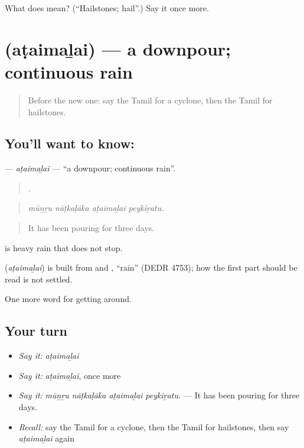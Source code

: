 \begin{tcolorbox}[breakable,colback=teal!4,colframe=teal!35!black,title={Before you move on}]
What does  mean? (\textquotedblleft{}Hailstones; hail\textquotedblright{}.) Say it once more.
\end{tcolorbox}
\section[\texorpdfstring{\ta{அடைமழை} (aṭaimaḻai)}{அடைமழை (aṭaimaḻai)}]{ (aṭaimaḻai) — a downpour; continuous rain}

\label{lesson:TA-C429-ataimalai}



\begin{quote}
Before the new one: say the Tamil for a cyclone, then the Tamil for hailstones.
\end{quote}

\subsection*{You'll want to know: }
\textbf{} — \emph{aṭaimaḻai} — \textquotedblleft{}a downpour; continuous rain\textquotedblright{}.

\begin{quote}
   .
\end{quote}

\begin{quote}
\emph{mūṉṟu nāṭkaḷāka aṭaimaḻai peykiṟatu.}
\end{quote}

\begin{quote}
It has been pouring for three days.
\end{quote}

 is heavy rain that does not stop.

\begin{cousinweb}
\textbf{} (\emph{aṭaimaḻai}) is built from  and , \textquotedblleft{}rain\textquotedblright{} (DEDR 4753); how the first part should be read is not settled.
\end{cousinweb}

\begin{grammarlens}[title={What you've built}]
One more word for getting around.
\end{grammarlens}

\subsection*{Your turn}
\begin{itemize}
\raggedright
  \item \emph{Say it:} \emph{aṭaimaḻai}
  \item \emph{Say it:} \emph{aṭaimaḻai}, once more
  \item \emph{Say it:} \emph{mūṉṟu nāṭkaḷāka aṭaimaḻai peykiṟatu.} — It has been pouring for three days.
  \item \emph{Recall:} say the Tamil for a cyclone, then the Tamil for hailstones, then say \emph{aṭaimaḻai} again
\end{itemize}

